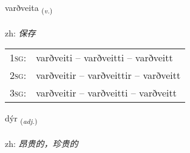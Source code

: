 \documentclass[frontgrid, backgrid]{flacards}\usepackage[]{graphicx}\usepackage[]{color}
\begin{document}
\renewcommand{\flhead}{\vskip5pt \fboxsep=0pt {\small\bfseries\footnotesize Sagnorð | 动词}}
\renewcommand{\fcfoot}{\vskip5pt \fboxsep=0pt \hspace{2pt}{\small\bfseries\footnotesize 2K}}

\renewcommand{\blhead}{\vskip5pt {\small\bfseries\footnotesize Sagnorð | 动词 }}
\renewcommand{\bcfoot}{\vskip5pt \hspace{2pt}{\small\bfseries\footnotesize 2K}}


{varðveita \small{\textsubscript{(\textit{v.})}} \\[1ex] %
\textphonetic{[varðveita]} \\
zh: \emph{保存} \\  [2ex]
\renewcommand*{\arraystretch}{0.8}
\begin{tabular}{p{1cm}l}
\textsc{1sg}: & varðveiti -- varðveitti -- varðveitt \\ 
\textsc{2sg}: & varðveitir -- varðveittir -- varðveitt \\ 
\textsc{3sg}: & varðveitir -- varðveitti -- varðveitt \\ 
\end{tabular}
}

\renewcommand{\flhead}{\vskip5pt \fboxsep=0pt {\small\bfseries\footnotesize Lýsingarorð | 形容词}}
\renewcommand{\fcfoot}{\vskip5pt \fboxsep=0pt \hspace{2pt}{\small\bfseries\footnotesize 2K}}

\renewcommand{\blhead}{\vskip5pt {\small\bfseries\footnotesize Lýsingarorð | 形容词 }}
\renewcommand{\bcfoot}{\vskip5pt \hspace{2pt}{\small\bfseries\footnotesize 2K}}


{dýr \small{\textsubscript{(\textit{adj.})}} \\[1ex] %
\textphonetic{[tiːr]} \\
zh: \emph{昂贵的，珍贵的} \\  [2ex]
\renewcommand*{\arraystretch}{0.8}
}
\end{document}
